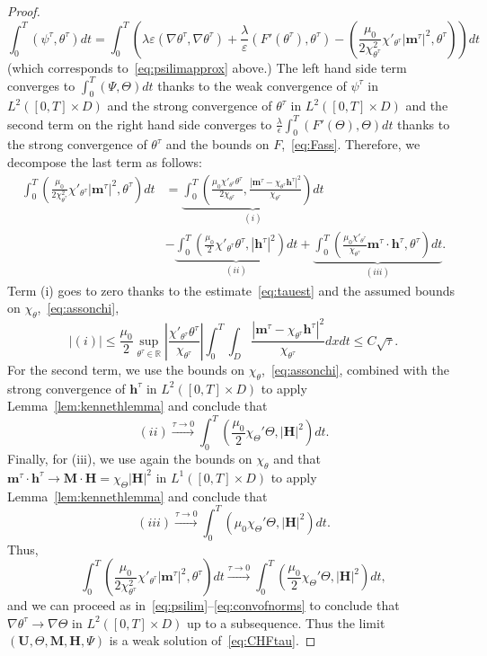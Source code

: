 \documentclass[10pt,letterpaper,twoside]{amsart}
\theoremstyle{definition}{\newtheorem{definition}[lemma]{Definition}}
\theoremstyle{note}{\newtheorem{claim}{Claim}[section]
\newtheorem*{claim*}{Claim}}
\numberwithin{equation}{section}
\newcommand{\dom}{D}
\newcommand{\eps}{\varepsilon}
\newcommand{\R}{\mathbb{R}}
\newcommand{\Grad}{\nabla}
\newcommand{\Bu}{\mathbf{U}}
\newcommand{\Bm}{\mathbf{M}}
\newcommand{\Bh}{\mathbf{H}}
\newcommand{\bmt}{\mathbf{m}^{\tau}}
\newcommand{\bht}{\mathbf{h}^{\tau}}
\newcommand{\tht}{\theta^{\tau}}
\newcommand{\psit}{\psi^{\tau}}
\begin{document}
\begin{proof}
	\begin{equation}\label{eq:psilimapprox2}
		\int_0^T(\psi^{\tau},\tht)dt =\int_0^T\left(\lambda \eps(\Grad\tht,\Grad \tht) +\frac{\lambda}{\eps}(F'(\tht),\tht)-\left(\frac{\mu_0}{2\chi_{\tht}^2}\chi'_{\tht}|\bmt|^2,\tht\right)\right) dt
	\end{equation}
	(which corresponds to~\eqref{eq:psilimapprox} above.) The left hand side term converges to $\int_0^T(\Psi,\Theta) dt$ thanks to the weak convergence of $\psit$ in $L^2([0,T]\times\dom)$ and the strong convergence of $\tht$ in $L^2([0,T]\times\dom)$ and the second term on the right hand side converges to $\frac{\lambda}{\epsilon}\int_0^T (F'(\Theta),\Theta) dt$ thanks to the strong convergence of $\tht$ and the bounds on $F$,~\eqref{eq:Fass}. Therefore, we decompose the last term as follows:
	\begin{align*}
	\int_0^T	\left(\frac{\mu_0}{2\chi_{\tht}^2}\chi'_{\tht}|\bmt|^2,\tht\right)dt & = \underbrace{	\int_0^T	\left(\frac{\mu_0\chi'_{\tht}\tht}{2\chi_{\tht}},\frac{|\bmt-\chi_{\tht}\bht|^2}{\chi_{\tht}}\right) dt}_{(i)} \\
	&- \underbrace{	\int_0^T	\left(\frac{\mu_0}{2}\chi'_{\tht}\tht,| \bht|^2\right) dt}_{(ii)} + \underbrace{	\int_0^T	\left(\frac{\mu_0\chi'_{\tht}}{ \chi_{\tht}}\bmt\cdot\bht ,\tht\right) dt}_{(iii)} .
	\end{align*}
	Term (i) goes to zero thanks to the estimate~\eqref{eq:tauest} and the assumed bounds on $\chi_\theta$,~\eqref{eq:assonchi},
	\begin{equation*}
		|(i)|  \leq \frac{\mu_0}{2}\sup_{\tht\in \R}\left|\frac{ \chi'_{\tht}\tht}{ \chi_{\tht}}\right|	\int_0^T	 \int_{\dom}\frac{|\bmt-\chi_{\tht}\bht|^2}{\chi_{\tht}}dx dt \leq C \sqrt{\tau}.
	\end{equation*}
	For the second term, we use the bounds on $\chi_\theta$,~\eqref{eq:assonchi}, combined with the strong convergence of $\bht$ in $L^2([0,T]\times\dom)$ to apply Lemma~\ref{lem:kennethlemma} and conclude that
	\begin{equation*}
		(ii) \stackrel{\tau\to0}{\longrightarrow} \int_0^T \left(\frac{\mu_0}{2}\chi_{\Theta}' \Theta,|\Bh|^2\right) dt.
	\end{equation*}
	Finally, for (iii), we use again the bounds on $\chi_\theta$ and that $\bmt\cdot\bht\to \Bm\cdot\Bh = \chi_{\Theta} |\Bh|^2$ in $L^1([0,T]\times\dom)$ to apply Lemma~\ref{lem:kennethlemma} and conclude that
	\begin{equation*}
		(iii) \stackrel{\tau\to0}{\longrightarrow} \int_0^T \left(\mu_0\chi_{\Theta}' \Theta,|\Bh|^2\right) dt.
	\end{equation*}
	Thus, 
	\begin{equation*}
			\int_0^T	\left(\frac{\mu_0}{2\chi_{\tht}^2}\chi'_{\tht}|\bmt|^2,\tht\right)dt \stackrel{\tau\to 0}{\longrightarrow} \int_0^T \left(\frac{\mu_0}{2}\chi_{\Theta}' \Theta,|\Bh|^2\right) dt,
	\end{equation*}
	and we can proceed as in~\eqref{eq:psilim}--\eqref{eq:convofnorms} to conclude that $\Grad\tht\to \Grad\Theta$ in $L^2([0,T]\times\dom)$ up to a subsequence.	 
	 Thus the limit $(\Bu,\Theta,\Bm,\Bh,\Psi)$ is a weak solution of~\eqref{eq:CHFtau}.
	

\end{proof}
\end{document}
